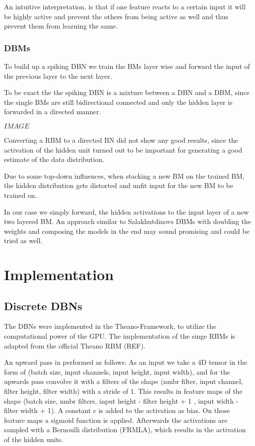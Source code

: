 An intuitive interpretation, is that if one feature reacts to a certain input it will be highly active and prevent the others from being active as well and thus prevent them from learning the same.  

\subsection{DBMs}

To build up a spiking DBN we train the BMs layer wise and forward the input of the previous layer to the next layer.

To be exact the the spiking DBN is a mixture between a DBN and a DBM, since the single BMs are still bidirectional connected and only the hidden layer is forwarded in a directed manner.

$IMAGE$

Converting a RBM to a directed BN did not show any good results, since the activation of the hidden unit turned out to be important for generating a good estimate of the data distribution. 

Due to some top-down influences, when stacking a new BM on the trained BM, the hidden distribution gets distorted and unfit input for the new BM to be trained on. 

In our case we simply forward, the hidden activations to the input layer of a new two layered BM. 
An approach similar to Salakhutdinovs DBMs with doubling the weights and composing the models in the end may sound promising and could be tried as well.

\chapter{Implementation}


\section{Discrete DBNs}

The DBNs were implemented in the Theano-Framework, to utilize the computational power of the GPU.
The implementation of the singe RBMs is adapted from the official Theano RBM (REF).

An upward pass in performed as follows:
As an input we take a 4D tensor in the form of (batch size, input channels, input height, input width), and for the upwards pass convolve it with a filters of the shape (nmbr filter, input channel, filter height, filter width) with a stride of 1.
This results in feature maps of the shape (batch size, nmbr filters, input height - filter height + 1 , input width - filter width + 1).
A constant c is added to the activation as bias.
On those feature maps a sigmoid function is applied. 
Afterwards the activations are sampled with a Bernoulli distribution (FRMLA), which results in the activation of the hidden units.

